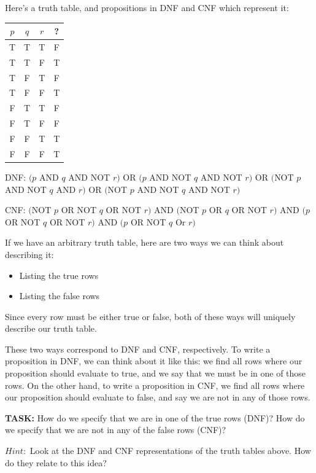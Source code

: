 \documentclass[12pt,letterpaper]{article}
\begin{document}
	Here's a truth table, and propositions in DNF and CNF which represent it:
	
	\begin{tabular}{c|c|c|c}
         $p$ & $q$ & $r$ & ?\\
        \hline
        T & T & T & F \\
        T & T & F & T \\
        T & F & T & F \\
        T & F & F & T \\
        F & T & T & F \\
        F & T & F & F \\
        F & F & T & T \\
        F & F & F & T
    \end{tabular}
    
    DNF: $(p $ AND $ q $ AND $ $NOT $ r) $ OR $ (p $ AND $ $NOT $ q $ AND $ $NOT $ r) $ OR $ ($NOT $ p $ AND $ $NOT $ q $ AND $ r) $ OR $ ($NOT $ p $ AND $ $NOT $ q $ AND $ $NOT $ r)$
    
	CNF: $($NOT $ p $ OR $ $NOT $ q $ OR $ $NOT $ r) $ AND $ ($NOT $ p $ OR $ q $ OR $ $NOT $ r) $ AND $ (p $ OR $ $NOT $ q $ OR $ $NOT $ r) $ AND $ (p $ OR $ $NOT $ q $ Or $ r)$
	
	If we have an arbitrary truth table, here are two ways we can think about describing it:

	\begin{itemize}
	    \item Listing the true rows
	    \item Listing the false rows
	\end{itemize}
	Since every row must be either true or false, both of these ways will uniquely describe our truth table.
	
	These two ways correspond to DNF and CNF, respectively. To write a proposition in DNF, we can think about it like this: we find all rows where our proposition should evaluate to true, and we say that we must be in one of those rows. On the other hand, to write a proposition in CNF, we find all rows where our proposition should evaluate to false, and say we are not in any of those rows.
	
	\textbf{TASK:} How do we specify that we are in one of the true rows (DNF)? How do we specify that we are not in any of the false rows (CNF)?
	
	$\textit{Hint}:$ Look at the DNF and CNF representations of the truth tables above. How do they relate to this idea?
	
\end{document}
